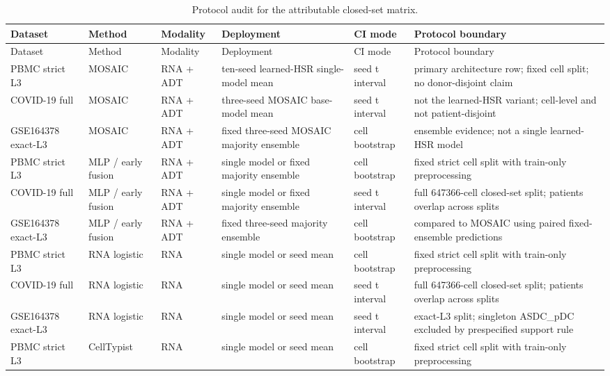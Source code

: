 \begingroup
\scriptsize
\setlength{\tabcolsep}{3pt}
\begin{longtable}{@{}>{\raggedright\arraybackslash}p{2.2cm}>{\raggedright\arraybackslash}p{2.0cm}>{\raggedright\arraybackslash}p{1.45cm}>{\raggedright\arraybackslash}p{3.1cm}>{\raggedright\arraybackslash}p{1.75cm}>{\raggedright\arraybackslash}p{5.3cm}@{}}
\caption{Protocol audit for the attributable closed-set matrix.}\label{tab:baseline-protocols}\\
\toprule
Dataset & Method & Modality & Deployment & CI mode & Protocol boundary \\
\midrule
\endfirsthead
\toprule
Dataset & Method & Modality & Deployment & CI mode & Protocol boundary \\
\midrule
\endhead
PBMC strict L3 & MOSAIC & RNA + ADT & ten-seed learned-HSR single-model mean & seed t interval & primary architecture row; fixed cell split; no donor-disjoint claim \\
COVID-19 full & MOSAIC & RNA + ADT & three-seed MOSAIC base-model mean & seed t interval & not the learned-HSR variant; cell-level and not patient-disjoint \\
GSE164378 exact-L3 & MOSAIC & RNA + ADT & fixed three-seed MOSAIC majority ensemble & cell bootstrap & ensemble evidence; not a single learned-HSR model \\
PBMC strict L3 & MLP / early fusion & RNA + ADT & single model or fixed majority ensemble & cell bootstrap & fixed strict cell split with train-only preprocessing \\
COVID-19 full & MLP / early fusion & RNA + ADT & single model or fixed majority ensemble & seed t interval & full 647366-cell closed-set split; patients overlap across splits \\
GSE164378 exact-L3 & MLP / early fusion & RNA + ADT & fixed three-seed majority ensemble & cell bootstrap & compared to MOSAIC using paired fixed-ensemble predictions \\
PBMC strict L3 & RNA logistic & RNA & single model or seed mean & cell bootstrap & fixed strict cell split with train-only preprocessing \\
COVID-19 full & RNA logistic & RNA & single model or seed mean & seed t interval & full 647366-cell closed-set split; patients overlap across splits \\
GSE164378 exact-L3 & RNA logistic & RNA & single model or seed mean & seed t interval & exact-L3 split; singleton ASDC\_pDC excluded by prespecified support rule \\
PBMC strict L3 & CellTypist & RNA & single model or seed mean & cell bootstrap & fixed strict cell split with train-only preprocessing \\

\end{longtable}

